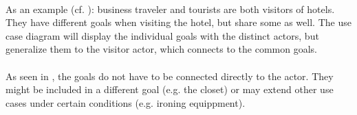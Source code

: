 \paragraph{} As an example (cf. ): business traveler and tourists are both visitors of hotels. They have different goals when visiting the hotel, but share some as well. The use case diagram will display the individual goals with the distinct actors, but generalize them to the visitor actor, which connects to the common goals. 

\paragraph{} As seen in , the goals do not have to be connected directly to the actor. They might be included in a different goal (e.g. the closet) or may extend other use cases under certain conditions (e.g. ironing equippment).

